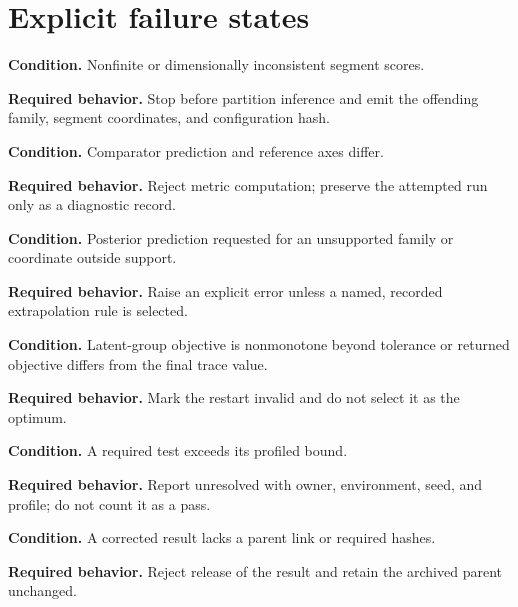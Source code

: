 \section{Explicit failure states}
\begin{cautionbox}[FAIL-BB-001]
\textbf{Condition.} Nonfinite or dimensionally inconsistent segment scores.\par
\textbf{Required behavior.} Stop before partition inference and emit the offending family, segment coordinates, and configuration hash.
\end{cautionbox}
\begin{cautionbox}[FAIL-BB-002]
\textbf{Condition.} Comparator prediction and reference axes differ.\par
\textbf{Required behavior.} Reject metric computation; preserve the attempted run only as a diagnostic record.
\end{cautionbox}
\begin{cautionbox}[FAIL-BB-003]
\textbf{Condition.} Posterior prediction requested for an unsupported family or coordinate outside support.\par
\textbf{Required behavior.} Raise an explicit error unless a named, recorded extrapolation rule is selected.
\end{cautionbox}
\begin{cautionbox}[FAIL-BB-004]
\textbf{Condition.} Latent-group objective is nonmonotone beyond tolerance or returned objective differs from the final trace value.\par
\textbf{Required behavior.} Mark the restart invalid and do not select it as the optimum.
\end{cautionbox}
\begin{cautionbox}[FAIL-BB-005]
\textbf{Condition.} A required test exceeds its profiled bound.\par
\textbf{Required behavior.} Report unresolved with owner, environment, seed, and profile; do not count it as a pass.
\end{cautionbox}
\begin{cautionbox}[FAIL-BB-006]
\textbf{Condition.} A corrected result lacks a parent link or required hashes.\par
\textbf{Required behavior.} Reject release of the result and retain the archived parent unchanged.
\end{cautionbox}

